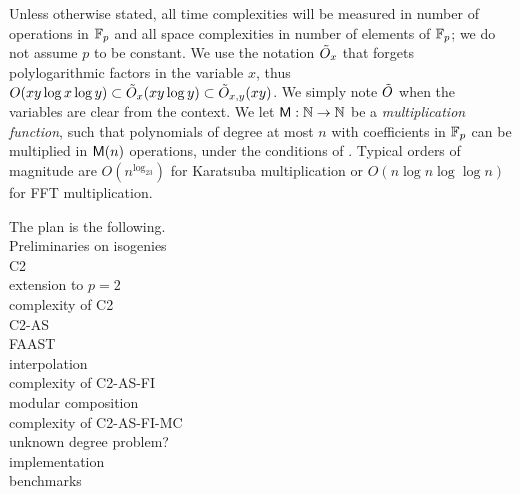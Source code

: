 Unless otherwise stated, all time complexities will be measured in
number of operations in $\mathbb{F}_p$ and all space complexities in number of
elements of $\mathbb{F}_p$; we do not assume $p$ to be constant. We use the
notation $\tilde{O}_x$ that forgets polylogarithmic factors in the
variable $x$, thus $O(xy\log x \log y)\subset\tilde{O}_x(xy\log
y)\subset\tilde{O}_{x,y}(xy)$. We simply note $\tilde{O}$ when the variables
are clear from the context. We let $\mathrm{\sf M}:\mathbb{N}\rightarrow\mathbb{N}$ be a
\emph{multiplication function}, such that polynomials of degree at
most $n$ with coefficients in $\mathbb{F}_p$ can be multiplied in $\mathrm{\sf M}(n)$
operations, under the conditions of \cite[Ch. 8.3]{vzGG}. Typical
orders of magnitude are $O(n^{\log_23})$ for Karatsuba multiplication
or $O(n\log n\log\log n)$ for FFT multiplication.

The plan is the following.\\
Preliminaries on isogenies\\
C2\\
extension to $p=2$\\
complexity of C2\\
C2-AS\\
FAAST\\
interpolation\\
complexity of C2-AS-FI\\
modular composition\\
complexity of C2-AS-FI-MC\\
unknown degree problem?\\
implementation\\
benchmarks\\



%
